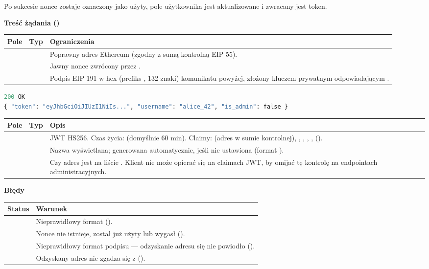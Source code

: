 Po sukcesie nonce zostaje oznaczony jako użyty, pole  użytkownika jest
aktualizowane i zwracany jest token.

\textbf{Treść żądania ()}

\begin{tabularx}{\textwidth}{llY}
\toprule
Pole & Typ & Ograniczenia \\
\midrule
{} &  & Poprawny adres Ethereum (zgodny z sumą kontrolną EIP-55). \\
 &  & Jawny nonce zwrócony przez . \\
 &  & Podpis EIP-191 w hex (prefiks , 132 znaki) komunikatu powyżej, złożony kluczem prywatnym odpowiadającym . \\
\bottomrule
\end{tabularx}

\begin{lstlisting}[language=Python]
200 OK
{ "token": "eyJhbGciOiJIUzI1NiIs...", "username": "alice_42", "is_admin": false }
\end{lstlisting}

\begin{tabularx}{\textwidth}{llY}
\toprule
Pole & Typ & Opis \\
\midrule
{} &  & JWT HS256. Czas życia:  (domyślnie 60 min). Claimy:  (adres w sumie kontrolnej), , , , ,  (). \\
 &  & Nazwa wyświetlana; generowana automatycznie, jeśli nie ustawiona (format ). \\
 &  & Czy adres jest na liście . Klient nie może opierać się na claimach JWT, by omijać tę kontrolę na endpointach administracyjnych. \\
\bottomrule
\end{tabularx}

\textbf{Błędy}

\begin{tabularx}{\textwidth}{lY}
\toprule
Status & Warunek \\
\midrule
{} & Nieprawidłowy format  (). \\
 & Nonce nie istnieje, został już użyty lub wygasł (). \\
 & Nieprawidłowy format podpisu --- odzyskanie adresu się nie powiodło (). \\
 & Odzyskany adres nie zgadza się z  (). \\
\bottomrule
\end{tabularx}

